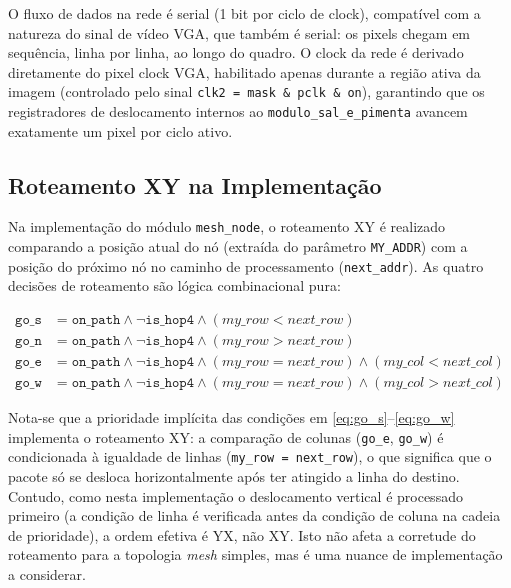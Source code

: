 \documentclass[12pt, a4paper]{article}
\begin{document}
	O fluxo de dados na rede é serial (1 bit por ciclo de clock), compatível com
	a natureza do sinal de vídeo VGA, que também é serial: os pixels chegam em
	sequência, linha por linha, ao longo do quadro. O clock da rede é derivado
	diretamente do pixel clock VGA, habilitado apenas durante a região ativa da
	imagem (controlado pelo sinal \texttt{clk2 = mask \& pclk \& on}), garantindo
	que os registradores de deslocamento internos ao \texttt{modulo\_sal\_e\_pimenta}
	avancem exatamente um pixel por ciclo ativo.
	
	\subsection{Roteamento XY na Implementação}
	
	Na implementação do módulo \texttt{mesh\_node}, o roteamento XY é realizado
	comparando a posição atual do nó (extraída do parâmetro \texttt{MY\_ADDR})
	com a posição do próximo nó no caminho de processamento (\texttt{next\_addr}).
	As quatro decisões de roteamento são lógica combinacional pura:
	
	\begin{align}
		\texttt{go\_s} &= \texttt{on\_path} \wedge \neg\texttt{is\_hop4} \wedge (my\_row < next\_row) \label{eq:go_s}\\
		\texttt{go\_n} &= \texttt{on\_path} \wedge \neg\texttt{is\_hop4} \wedge (my\_row > next\_row) \label{eq:go_n}\\
		\texttt{go\_e} &= \texttt{on\_path} \wedge \neg\texttt{is\_hop4} \wedge (my\_row = next\_row) \wedge (my\_col < next\_col) \label{eq:go_e}\\
		\texttt{go\_w} &= \texttt{on\_path} \wedge \neg\texttt{is\_hop4} \wedge (my\_row = next\_row) \wedge (my\_col > next\_col) \label{eq:go_w}
	\end{align}
	
	Nota-se que a prioridade implícita das condições em \eqref{eq:go_s}--\eqref{eq:go_w}
	implementa o roteamento XY: a comparação de colunas (\texttt{go\_e},
	\texttt{go\_w}) é condicionada à igualdade de linhas (\texttt{my\_row =
		next\_row}), o que significa que o pacote só se desloca horizontalmente
	após ter atingido a linha do destino. Contudo, como nesta implementação o
	deslocamento vertical é processado primeiro (a condição de linha é verificada
	antes da condição de coluna na cadeia de prioridade), a ordem efetiva é
	YX, não XY. Isto não afeta a corretude do roteamento para a topologia
	\textit{mesh} simples, mas é uma nuance de implementação a considerar.
	
\end{document}
